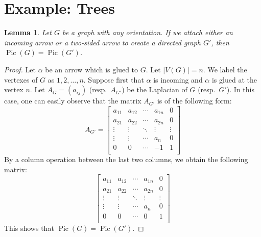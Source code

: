 \documentclass[11pt,reqno]{amsart}
\DeclareMathOperator{\Pic}{Pic}
\theoremstyle{definition}
\theoremstyle{plain}
\newtheorem{lem}[mydef]{\textbf{Lemma}}
\begin{document}
\section{Example: Trees}

	\begin{lem}
		Let $G$ be a graph with any orientation. If we attach either an incoming arrow or a two-sided
		arrow to create a directed graph $G'$, then $\Pic(G)=\Pic(G')$. \label{proposition: gluing an arrow proposition}
	\end{lem}
	\begin{proof}
		Let $\alpha$ be an arrow which is glued to $G$. Let $|V(G)|=n$. We label the vertexes of
		$G$ as $1,2,\dots,n$. Suppose first that $\alpha$ is incoming and $\alpha$ is glued at the vertex $n$.
		Let $A_G=(a_{ij})$ (resp.~$A_{G'}$) be the Laplacian of $G$ (resp.~$G'$). In this case, one can easily
		observe that the matrix $A_{G'}$ is of the following form:
		\begin{equation}
			A_{G'}=\left[\begin{array}{ccc|c|c}
				a_{11}&a_{12}&\cdots &a_{1n}&0\\
				a_{21}&a_{22}&\cdots &a_{2n}&0\\
				\vdots & \vdots &\ddots & \vdots & \vdots \\ \hline
					\vdots & \vdots & \cdots&a_n & 0\\ \hline
				0&0&\cdots &-1&1\\
			\end{array}\right]
		\end{equation}
		By a column operation between the last two columns, we obtain the following matrix:
		\begin{equation}\label{eq: arrow adding matrix}
			\left[\begin{array}{ccc|c|c}
				a_{11}&a_{12}&\cdots &a_{1n}&0\\
				a_{21}&a_{22}&\cdots &a_{2n}&0\\
				\vdots & \vdots &\ddots & \vdots & \vdots \\ \hline
				\vdots & \vdots & \cdots&a_n & 0\\ \hline
				0&0&\cdots &0&1\\
			\end{array}\right]
		\end{equation}
		This shows that $\Pic(G)=\Pic(G')$.


\end{proof}
\end{document}
